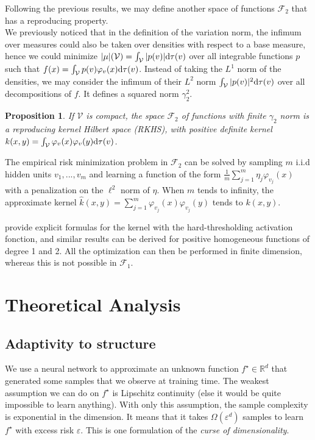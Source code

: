 \documentclass[a4paper, 11pt]{scrartcl}
\newtheorem{proposition}{Proposition}[section]
\begin{document}
Following the previous results, we may define another space of functions $\mathcal{F}_2$ that has a reproducing property. \\

We previously noticed that in the definition of the variation norm, the infimum over measures could also be taken over densities with respect to a base measure, hence we could minimize $|\mu|(\mathcal{V}) = \int_\mathcal{V} |p(v)| \textnormal{d}\tau(v)$ over all integrable functions $p$ such that $f(x) = \int_\mathcal{V} p(v) \varphi_v(x)\textnormal{d}\tau(v)$. Instead of taking the $L^1$ norm of the densities, we may consider the infimum of their $L^2$ norm $\int_\mathcal{V} |p(v)|^2 \textnormal{d}\tau(v)$ over all decompositions of $f$. It defines a squared norm $\gamma_2^2$.


\begin{proposition}
If $\mathcal{V}$ is compact, the space $\mathcal{F}_2$ of functions with finite $\gamma_2$ norm is a reproducing kernel Hilbert space (RKHS), with positive definite kernel $k(x,y)=\int_\mathcal{V} \varphi_v(x) \varphi_v(y) \textnormal{d}\tau(v)$.
\end{proposition}

The empirical risk minimization problem in $\mathcal{F}_2$ can be solved by sampling $m$ i.i.d hidden units $v_1,...,v_m$ and learning a function of the form $\frac{1}{m} \sum_{j=1}^m \eta_j \varphi_{v_j}(x)$ with a penalization on the $\ell^2$ norm of $\eta$. When $m$ tends to infinity, the approximate kernel $\hat k(x,y) = \sum_{j=1}^m \varphi_{v_j}(x) \varphi_{v_j}(y)$ tends to $k(x,y)$.

\cite{le2007continuous} provide explicit formulas for the kernel with the hard-thresholding activation fonction, and similar results can be derived for positive homogeneous functions of degree 1 and 2. All the optimization can then be performed in finite dimension, whereas this is not possible in $\mathcal{F}_1$. 

\section{Theoretical Analysis}

\subsection{Adaptivity to structure}

We use a neural network to approximate an unknown function $f^\star \in \mathbb{R}^d$ that generated some samples that we observe at training time. The weakest assumption we can do on $f^\star$ is Lipschitz continuity (else it would be quite impossible to learn anything). With only this assumption, the sample complexity is exponential in the dimension. It means that it takes $\Omega(\varepsilon^{d})$ samples to learn $f^\star$ with excess risk $\varepsilon$. This is one formulation of the \textit{curse of dimensionality}.
\end{document}
